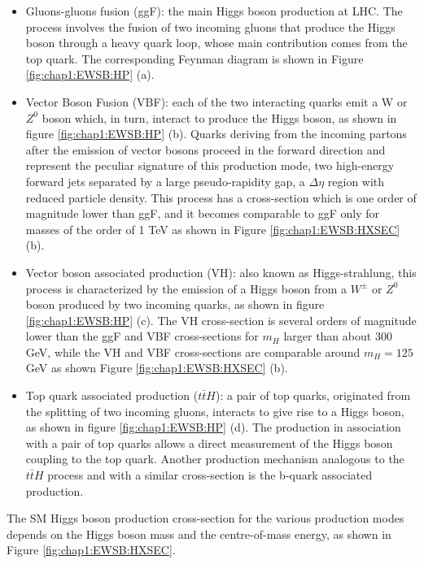 \begin{itemize}
	\item Gluons-gluons fusion (ggF): the main Higgs boson production at LHC. The process involves the fusion of two incoming gluons that produce the Higgs boson through a heavy quark loop, whose main contribution comes from the top quark. The corresponding Feynman diagram is shown in Figure \ref{fig:chap1:EWSB:HP} (a).  
	\item Vector Boson Fusion (VBF): each of the two interacting quarks emit a W or $Z^0$ boson which, in turn, interact to produce the Higgs boson, as shown in figure \ref{fig:chap1:EWSB:HP} (b). Quarks deriving from the incoming partons after the emission of vector bosons proceed in the forward direction and represent the peculiar signature of this production mode, two high-energy forward jets separated by a large pseudo-rapidity gap, a $\Delta\eta$ region with reduced particle density. This process has a cross-section which is one order of magnitude lower than ggF, and it becomes comparable to ggF only for masses of the order of 1 TeV as shown in Figure \ref{fig:chap1:EWSB:HXSEC} (b).
	\item Vector boson associated production (VH): also known as Higgs-strahlung, this process is characterized by the emission of a Higgs boson from a $W^{\pm}$ or $Z^0$ boson produced by two incoming quarks, as shown in figure \ref{fig:chap1:EWSB:HP} (c). The VH cross-section is several orders of magnitude lower than the ggF and VBF cross-sections for $m_H$ larger than about 300 GeV, while the VH and VBF cross-sections are comparable around $m_H = 125$ GeV as shown Figure \ref{fig:chap1:EWSB:HXSEC} (b).
	\item Top quark associated production ($t\bar{t}H$): a pair of top quarks, originated from the splitting of two incoming gluons, interacts to give rise to a Higgs boson, as shown in figure \ref{fig:chap1:EWSB:HP} (d). The production in association with a pair of top quarks allows a direct measurement of the Higgs boson coupling to the top quark. Another production mechanism analogous to the $t\bar{t}H$ process and with a similar cross-section is the b-quark associated production.
\end{itemize}
The SM Higgs boson production cross-section for the various production modes depends on the Higgs boson mass and the centre-of-mass energy, as shown in Figure \ref{fig:chap1:EWSB:HXSEC}. 
